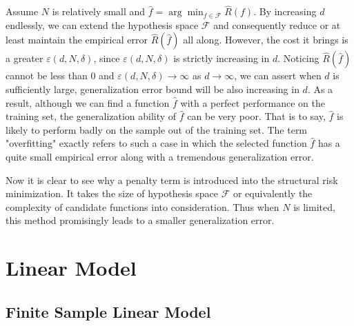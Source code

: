 \documentclass{report}
\theoremstyle{nonumberplain}
\newcommand{\0}{\mathbf{0}}
\begin{document}
Assume $N$ is relatively small and $\hat{f}=\arg\min_{f\in\mathcal{F}}\widehat{R}(f).$ By increasing $d$ endlessly, we can extend the hypothesis space $\mathcal{F}$ and consequently reduce or at least maintain the empirical error $\widehat{R}(\hat{f})$ all along. However, the cost it brings is a greater $\varepsilon(d, N, \delta)$, since $\varepsilon(d, N, \delta)$ is strictly increasing in $d$. Noticing $\widehat{R}(\hat{f})$ cannot be less than 0 and $\varepsilon(d, N, \delta)\to\infty$ as $d\to\infty$, we can assert when $d$ is sufficiently large, generalization error bound will be also increasing in $d$. As a result, although we can find a function $\hat{f}$ with a perfect performance on the training set, the generalization ability of $\hat{f}$ can be very poor. That is to say, $\hat{f}$ is likely to perform badly on the sample out of the training set. The term "overfitting" exactly refers to such a case in which the selected function $\hat{f}$ has a quite small empirical error along with a tremendous generalization error. 

Now it is clear to see why a penalty term is introduced into the structural risk minimization. It takes the size of hypothesis space $\mathcal{F}$ or equivalently the complexity of candidate functions into consideration. Thus when $N$ is limited, this method promisingly leads to a smaller generalization error.






\chapter{Linear Model}
\section{Finite Sample Linear Model}
\end{document}
